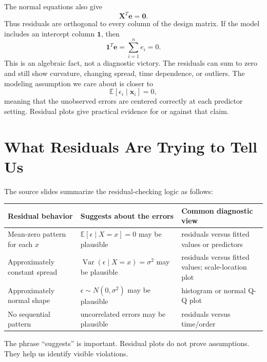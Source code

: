 The normal equations also give
\begin{equation}
  \mathbf{X}^T\mathbf{e}=\mathbf{0}.
  \label{eq:ch12-xte-zero}
\end{equation}
Thus residuals are orthogonal to every column of the design matrix.  If the model includes an intercept column \(\mathbf{1}\), then
\begin{equation}
  \mathbf{1}^T\mathbf{e}=\sum_{i=1}^n e_i=0.
\end{equation}
This is an algebraic fact, not a diagnostic victory.  The residuals can sum to zero and still show curvature, changing spread, time dependence, or outliers.  The modeling assumption we care about is closer to
\begin{equation}
  \mathbb{E}[\epsilon_i\mid \mathbf{x}_i]=0,
\end{equation}
meaning that the unobserved errors are centered correctly at each predictor setting.  Residual plots give practical evidence for or against that claim.

\section{What Residuals Are Trying to Tell Us}

The source slides summarize the residual-checking logic as follows:
\begin{center}
\begin{tabular}{p{}p{}p{}}
\toprule
Residual behavior & Suggests about the errors & Common diagnostic view \\
\midrule
Mean-zero pattern for each \(x\) & \(\mathbb{E}[\epsilon\mid X=x]=0\) may be plausible & residuals versus fitted values or predictors \\
Approximately constant spread & \(\operatorname{Var}(\epsilon\mid X=x)=\sigma^2\) may be plausible & residuals versus fitted values; scale-location plot \\
Approximately normal shape & \(\epsilon\sim N(0,\sigma^2)\) may be plausible & histogram or normal Q-Q plot \\
No sequential pattern & uncorrelated errors may be plausible & residuals versus time/order \\
\bottomrule
\end{tabular}
\end{center}

The phrase ``suggests'' is important.  Residual plots do not prove assumptions.  They help us identify visible violations.

